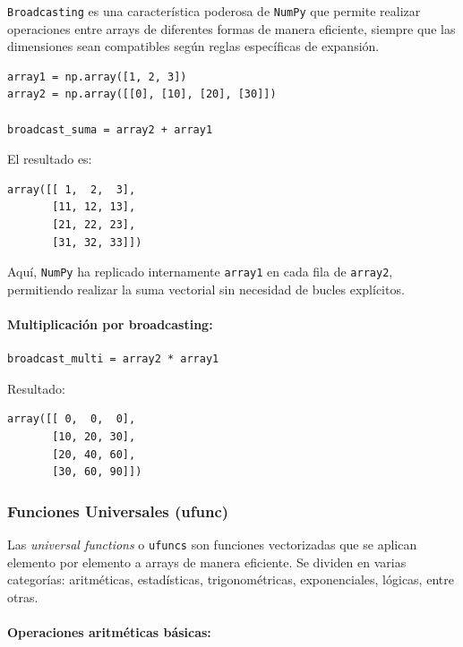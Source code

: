 \documentclass{article}
\theoremstyle{nonumberplain}
\begin{document}
\texttt{Broadcasting} es una característica poderosa de \texttt{NumPy} que permite realizar operaciones entre arrays de diferentes formas de manera eficiente, siempre que las dimensiones sean compatibles según reglas específicas de expansión.

\begin{verbatim}
array1 = np.array([1, 2, 3])
array2 = np.array([[0], [10], [20], [30]])

broadcast_suma = array2 + array1
\end{verbatim}

El resultado es:

\begin{verbatim}
array([[ 1,  2,  3],
       [11, 12, 13],
       [21, 22, 23],
       [31, 32, 33]])
\end{verbatim}

Aquí, \texttt{NumPy} ha replicado internamente \texttt{array1} en cada fila de \texttt{array2}, permitiendo realizar la suma vectorial sin necesidad de bucles explícitos.

\paragraph{Multiplicación por broadcasting:}

\begin{verbatim}
broadcast_multi = array2 * array1
\end{verbatim}

Resultado:

\begin{verbatim}
array([[ 0,  0,  0],
       [10, 20, 30],
       [20, 40, 60],
       [30, 60, 90]])
\end{verbatim}

\subsubsection*{Funciones Universales (ufunc)}

Las \textit{universal functions} o \texttt{ufuncs} son funciones vectorizadas que se aplican elemento por elemento a arrays de manera eficiente. Se dividen en varias categorías: aritméticas, estadísticas, trigonométricas, exponenciales, lógicas, entre otras.

\paragraph{Operaciones aritméticas básicas:}
\end{document}
